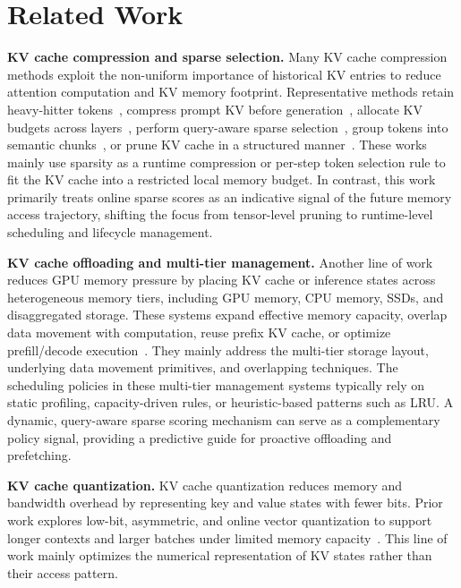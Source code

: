 \documentclass[sigplan,10pt,review,anonymous]{acmart}
\begin{document}
\section{Related Work}
\label{sec:related_work}

\noindent\textbf{KV cache compression and sparse selection.}
Many KV cache compression methods exploit the non-uniform importance of historical KV entries to reduce attention computation and KV memory footprint.
Representative methods retain heavy-hitter tokens~\cite{zhang2023h2o}, compress prompt KV before generation~\cite{li2024snapkv}, allocate KV budgets across layers~\cite{cai2024pyramidkv,yang2024pyramidinfer}, perform query-aware sparse selection~\cite{tang2024quest}, group tokens into semantic chunks~\cite{liu2026chunkkv}, or prune KV cache in a structured manner~\cite{chitty2026pagedeviction,devoto2025expected,zhao2026hitkv,behnam2025rocketkv}.
These works mainly use sparsity as a runtime compression or per-step token selection rule to fit the KV cache into a restricted local memory budget.
In contrast, this work primarily treats online sparse scores as an indicative signal of the future memory access trajectory, shifting the focus from tensor-level pruning to runtime-level scheduling and lifecycle management.

\noindent\textbf{KV cache offloading and multi-tier management.}
Another line of work reduces GPU memory pressure by placing KV cache or inference states across heterogeneous memory tiers, including GPU memory, CPU memory, SSDs, and disaggregated storage.
These systems expand effective memory capacity, overlap data movement with computation, reuse prefix KV cache, or optimize prefill/decode execution~\cite{sheng2023flexgen,lee2024infinigen,xiong2024layerkv,xu2024pie,sun2025breaking,lin2026kvdrive,hu2026bidaw,qin2024mooncake,chen2025impress,liu2025lmcache,liu2024cachegen,yao2025cacheblend}.
They mainly address the multi-tier storage layout, underlying data movement primitives, and overlapping techniques.
The scheduling policies in these multi-tier management systems typically rely on static profiling, capacity-driven rules, or heuristic-based patterns such as LRU.
A dynamic, query-aware sparse scoring mechanism can serve as a complementary policy signal, providing a predictive guide for proactive offloading and prefetching.

\noindent\textbf{KV cache quantization.}
KV cache quantization reduces memory and bandwidth overhead by representing key and value states with fewer bits.
Prior work explores low-bit, asymmetric, and online vector quantization to support longer contexts and larger batches under limited memory capacity~\cite{liu2024kivi,hooper2024kvquant,zandieh2025turboquant}.
This line of work mainly optimizes the numerical representation of KV states rather than their access pattern.
\end{document}
